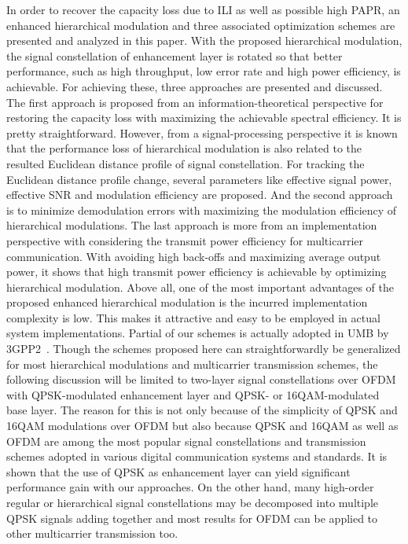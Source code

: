 \documentclass[conference]{IEEEtran}
\begin{document}
In order to recover the capacity loss due to ILI as well as
possible high PAPR, an enhanced hierarchical modulation and three
associated optimization schemes are presented and analyzed in this
paper. With the proposed hierarchical modulation, the signal
constellation of enhancement layer is rotated so that better
performance, such as high throughput, low error rate and high
power efficiency, is achievable. For achieving these, three
approaches are presented and discussed.  The first approach is
proposed from an information-theoretical perspective for restoring
the capacity loss with maximizing the achievable spectral
efficiency. It is pretty straightforward. However, from a
signal-processing perspective it is known that the performance
loss of hierarchical modulation is also related to the resulted
Euclidean distance profile of signal constellation. For tracking
the Euclidean distance profile change, several parameters like
effective signal power, effective SNR and modulation efficiency
are proposed. And the second approach is to minimize demodulation
errors with maximizing the modulation efficiency of hierarchical
modulations. The last approach is more from an implementation
perspective with considering the transmit power efficiency for
multicarrier communication. With avoiding high back-offs and
maximizing average output power, it shows that high transmit power
efficiency is achievable by optimizing hierarchical modulation.
Above all, one of the most important advantages of the proposed
enhanced hierarchical modulation is the incurred implementation
complexity is low. This makes it attractive and easy to be
employed in actual system implementations. Partial of our schemes
is actually adopted in UMB by 3GPP2~\cite{UMB}. Though the schemes
proposed here can straightforwardly be generalized for most
hierarchical modulations and multicarrier transmission schemes,
the following discussion will be limited to two-layer signal
constellations over OFDM with QPSK-modulated enhancement layer and
QPSK- or 16QAM-modulated base layer. The reason for this is not
only because of the simplicity of QPSK and 16QAM modulations over
OFDM but also because QPSK and 16QAM as well as OFDM are among the
most popular signal constellations and transmission schemes
adopted in various digital communication systems and standards. It
is shown that the use of QPSK as enhancement layer can yield
significant performance gain with our approaches. On the other
hand, many high-order regular or hierarchical signal
constellations may be decomposed into multiple QPSK signals adding
together and most results for OFDM can be applied to other
multicarrier transmission too.
\end{document}
